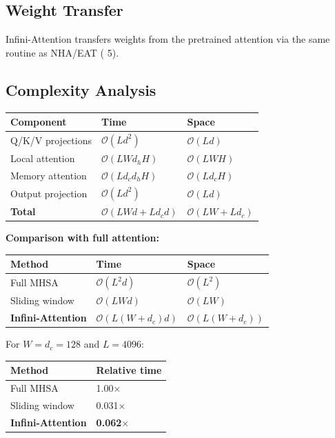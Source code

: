 \subsection{Weight Transfer}

Infini-Attention transfers weights from the pretrained attention via the 
same routine as NHA/EAT ( 5).

\subsection{Complexity Analysis}

\begin{table}[H]
\centering
\small
\begin{tabular}{lll}
\toprule
\textbf{Component} & \textbf{Time} & \textbf{Space} \\
\midrule
Q/K/V projections & $\mathcal{O}(L d^2)$ & $\mathcal{O}(L d)$ \\
Local attention & $\mathcal{O}(L W d_h H)$ & $\mathcal{O}(L W H)$ \\
Memory attention & $\mathcal{O}(L d_c d_h H)$ & $\mathcal{O}(L d_c H)$ \\
Output projection & $\mathcal{O}(L d^2)$ & $\mathcal{O}(L d)$ \\
\textbf{Total} & $\mathcal{O}(L W d + L d_c d)$ & $\mathcal{O}(L W + L d_c)$ \\
\bottomrule
\end{tabular}
\end{table}

\textbf{Comparison with full attention:}

\begin{table}[H]
\centering
\small
\begin{tabular}{lll}
\toprule
\textbf{Method} & \textbf{Time} & \textbf{Space} \\
\midrule
Full MHSA & $\mathcal{O}(L^2 d)$ & $\mathcal{O}(L^2)$ \\
Sliding window & $\mathcal{O}(L W d)$ & $\mathcal{O}(L W)$ \\
\textbf{Infini-Attention} & $\mathcal{O}(L(W + d_c) d)$ & $\mathcal{O}(L(W + d_c))$ \\
\bottomrule
\end{tabular}
\end{table}

For $W = d_c = 128$ and $L = 4096$:

\begin{table}[H]
\centering
\small
\begin{tabular}{ll}
\toprule
\textbf{Method} & \textbf{Relative time} \\
\midrule
Full MHSA & 1.00$\times$ \\
Sliding window & 0.031$\times$ \\
\textbf{Infini-Attention} & \textbf{0.062$\times$} \\
\bottomrule
\end{tabular}
\end{table}

